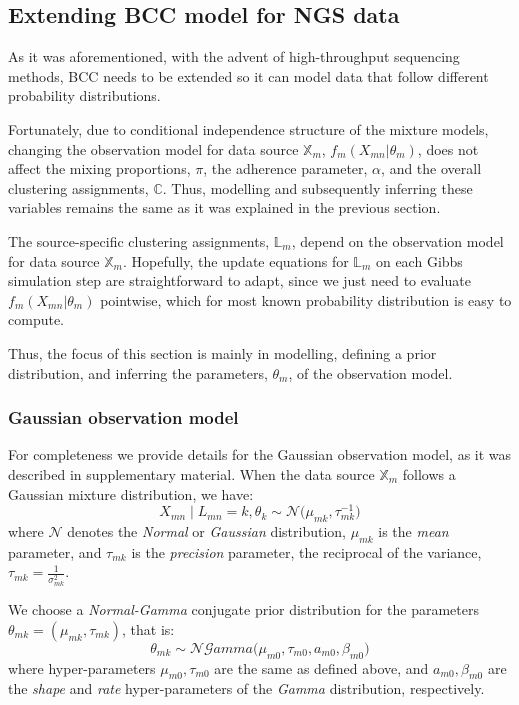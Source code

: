 \subsection{Extending BCC model for NGS data}\label{integr-extension-subsect}
As it was aforementioned, with the advent of high-throughput sequencing methods, BCC needs to be extended so it can model data that follow different probability distributions.

Fortunately, due to conditional independence structure of the mixture models, changing the observation model for data source $\mathbb{X}_{m}$, $f_{m}(X_{mn}|\theta_{m})$, does not affect the mixing proportions, $\pi$, the adherence parameter, $\alpha$, and the overall clustering assignments, $\mathbb{C}$. Thus, modelling and subsequently inferring these variables remains the same as it was explained in the previous section.

The source-specific clustering assignments, $\mathbb{L}_{m}$, depend on the observation model for data source $\mathbb{X}_{m}$. Hopefully, the update equations for $\mathbb{L}_{m}$ on each Gibbs simulation step are straightforward to adapt, since we just need to evaluate $f_{m}(X_{mn}|\theta_{m})$ pointwise, which for most known probability distribution is easy to compute.

Thus, the focus of this section is mainly in modelling, \ie defining a prior distribution, and inferring the parameters, $\theta_{m}$, of the observation model. 

\subsubsection*{Gaussian observation model}
For completeness we provide details for the Gaussian observation model, as it was described in \citet{Lock2013} supplementary material. When the data source $\mathbb{X}_{m}$ follows a Gaussian mixture distribution, we have:
\begin{equation}
	X_{mn} \mid L_{mn} = k, \theta_{k} \sim \mathcal{N}\big(\mu_{mk}, \tau_{mk}^{-1}\big)
\end{equation}
where $\mathcal{N}$ denotes the \emph{Normal} or \emph{Gaussian} distribution, $\mu_{mk}$ is the \emph{mean} parameter, and $\tau_{mk}$ is the \emph{precision} parameter, \ie the reciprocal of the variance, $\tau_{mk} = \frac{1}{\sigma_{mk}^{2}}$.

We choose a \emph{Normal-Gamma} conjugate prior distribution for the parameters $\theta_{mk} = (\mu_{mk}, \tau_{mk})$, that is:
\begin{equation}
	\theta_{mk} \sim \mathcal{NG}amma\big(\mu_{m0}, \tau_{m0}, \mathit{a}_{m0}, \beta_{m0}\big)
\end{equation}
where hyper-parameters $\mu_{m0}, \tau_{m0}$ are the same as defined above, and $\mathit{a}_{m0}, \beta_{m0}$ are the \emph{shape} and \emph{rate} hyper-parameters of the \emph{Gamma} distribution, respectively.

